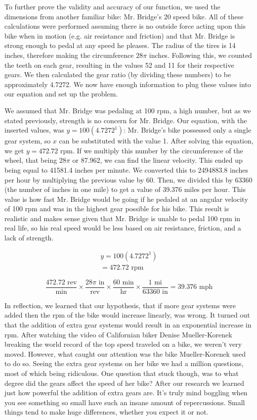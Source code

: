 To further prove the validity and accuracy of our function, we used the dimensions from another familiar bike: Mr. Bridge’s 20 speed bike. All of these calculations were performed  assuming there is no outside force acting upon this bike when in motion (e.g. air resistance and  friction) and that Mr. Bridge is strong enough to pedal at any speed he pleases. The radius of the tires is 14 inches, therefore making the circumference $28\pi$ inches. Following this, we counted the teeth on each gear, resulting in the values 52 and 11 for their respective gears. We then calculated  the gear ratio (by dividing these numbers) to be approximately 4.7272. We now have enough  information to plug these values into our equation and set up the problem.  

We assumed that Mr. Bridge was pedaling at 100 rpm, a high number,  but as we stated previously, strength is no concern for Mr. Bridge. Our equation, with the inserted values, was $y=100(4.7272^{1})$: Mr. Bridge’s bike possessed only a single gear system,  so $x$ can be substituted with the value 1. After solving this equation, we get $y=472.72$ rpm.  If we multiply this number by the circumference of the wheel, that being $28\pi$ or 87.962, we can  find the linear velocity. This ended up being equal to 41581.4 inches per minute. We converted this to 2494883.8 inches per hour by multiplying the previous value by 60. Then, we divided this by 63360 (the number of inches in one mile) to get a value of 39.376 miles per hour.  This value is how fast Mr. Bridge would be going if he pedaled at an angular velocity of 100 rpm and was in the highest gear possible for his bike. This result is realistic and makes sense given that Mr. Bridge is unable to pedal 100 rpm in real life, so his real speed would be less based on air resistance, friction, and a lack of strength.  

\begin{align*}
y=100(4.7272^{1}) \\
= 472.72 \text{ rpm} 
\end{align*}

$$
\frac{472.72 \text{ rev}}{\text{min}} \times \frac{28\pi \text{ in}}{\text{rev}} \times \frac{60 \text{ min}}{\text{hr}} \times \frac{1 \text{ mi}}{63360 \text{ in}} = 39.376 \text{ mph}
$$

In reflection, we learned that our hypothesis, that if more gear systems were added then  the rpm of the bike would increase linearly, was wrong. It turned out that the addition of extra gear systems would result in an exponential increase in rpm. After watching the video of Californian biker Denise Mueller-Korenek breaking the world record of the top speed traveled on  a bike, we weren’t very moved. However, what caught our attention was the bike Mueller-Korenek used to do so. Seeing the extra gear systems on her bike we had a million  questions, most of which being ridiculous. One question that stuck though, was to what degree did the gears affect the speed of her bike? After our research we learned just how powerful the addition of extra gears are. It’s truly mind boggling when you see something so small have such  an insane amount of repercussions. Small things tend to make huge differences, whether you  expect it or not. 

